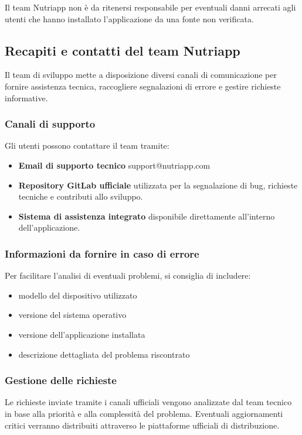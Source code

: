 \documentclass[a4paper,12pt]{article}
\begin{document}
    Il team Nutriapp non è da ritenersi responsabile per eventuali danni arrecati agli utenti che hanno installato l'applicazione da una fonte non verificata.


    \subsection{Recapiti e contatti del team Nutriapp}

    Il team di sviluppo mette a disposizione diversi canali di comunicazione per fornire assistenza tecnica, raccogliere segnalazioni di errore e gestire richieste informative.

    \subsubsection*{Canali di supporto}

    Gli utenti possono contattare il team tramite:

    \begin{itemize}

        \item \textbf{Email di supporto tecnico}
        support@nutriapp.com

        \item \textbf{Repository GitLab ufficiale}
        utilizzata per la segnalazione di bug,
        richieste tecniche e contributi allo sviluppo.

        \item \textbf{Sistema di assistenza integrato}
        disponibile direttamente all'interno dell'applicazione.

    \end{itemize}

    \subsubsection*{Informazioni da fornire in caso di errore}

    Per facilitare l'analisi di eventuali problemi, si consiglia di includere:

    \begin{itemize}

        \item modello del dispositivo utilizzato

        \item versione del sistema operativo

        \item versione dell'applicazione installata

        \item descrizione dettagliata del problema riscontrato

    \end{itemize}

    \subsubsection*{Gestione delle richieste}

    Le richieste inviate tramite i canali ufficiali vengono analizzate dal team tecnico in base alla priorità e alla complessità del problema. Eventuali aggiornamenti critici verranno distribuiti attraverso le piattaforme ufficiali di distribuzione.
\end{document}
